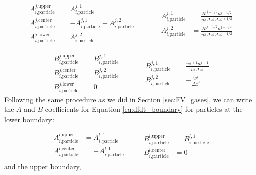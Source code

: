 \begin{equation*}
  \begin{aligned}
    A_{i\text{,particle}}^{j\text{,upper}} &= A_{i\text{,particle}}^{j,1} \\
    A_{i\text{,particle}}^{j\text{,center}} &= - A_{i\text{,particle}}^{j,1} - A_{i\text{,particle}}^{j,2} \\
    A_{i\text{,particle}}^{j\text{,lower}} &= A_{i\text{,particle}}^{j,2}
  \end{aligned}
  \quad\quad\quad
  \begin{aligned}
    A_{i\text{,particle}}^{j,1} &= \frac{K^{j+1/2} n^{j+1/2}}{n^j \Delta z^j \Delta z^{j+1/2}} \\
    A_{i\text{,particle}}^{j,2} &= \frac{K^{j-1/2} n^{j-1/2}}{n^j \Delta z^j \Delta z^{j-1/2}}
  \end{aligned}
\end{equation*}

\begin{equation*}
  \begin{aligned}
    B_{i\text{,particle}}^{j\text{,upper}} &= B_{i\text{,particle}}^{j,1} \\
    B_{i\text{,particle}}^{j\text{,center}} &= B_{i\text{,particle}}^{j,2} \\
    B_{i\text{,particle}}^{j\text{,lower}} &= 0
  \end{aligned}
  \quad\quad\quad
  \begin{aligned}
    B_{i\text{,particle}}^{j,1} &= \frac{w^{j+1}n^{j+1}}{n^j \Delta z^j} \\
    B_{i\text{,particle}}^{j,2} &= -\frac{ w^{j} }{\Delta z^j}
  \end{aligned}
\end{equation*}
Following the same procedure as we did in Section \ref{sec:FV_gases}, we can write the $A$ and $B$ coefficients for Equation \eqref{eq:dfdt_boundary} for particles at the lower boundary:

\begin{equation*}
  \begin{aligned}
  A_{i\text{,particle}}^{l\text{,upper}} &= A_{i\text{,particle}}^{l,1} \\
  A_{i\text{,particle}}^{l\text{,center}} &= - A_{i\text{,particle}}^{l,1} \\
  \end{aligned}
  \quad\quad
  \begin{aligned}
  B_{i\text{,particle}}^{l\text{,upper}} &= B_{i\text{,particle}}^{l,1} \\
  B_{i\text{,particle}}^{l\text{,center}} &= 0
  \end{aligned}
\end{equation*}
and the upper boundary,

